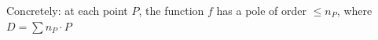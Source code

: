 \documentclass[preview]{standalone}
\begin{document}
\begin{center}
Concretely: at each point $P$, the function $f$ has a pole of order $\leq n_P$, \; where $D = \sum n_P \cdot P$
\end{center}
\end{document}

